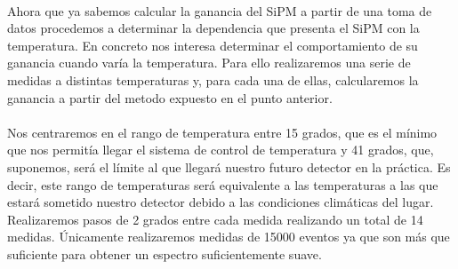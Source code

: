 \paragraph {}
Ahora que ya sabemos calcular la ganancia del SiPM a partir de una toma de datos procedemos a determinar la dependencia que presenta el SiPM con la temperatura. En concreto nos interesa determinar el comportamiento de su ganancia cuando varía la temperatura. Para ello realizaremos una serie de medidas a distintas temperaturas y, para cada una de ellas, calcularemos la ganancia a partir del metodo expuesto en el punto anterior.

\paragraph {}
Nos centraremos en el rango de temperatura entre 15 grados, que es el mínimo que nos permitía llegar el sistema de control de temperatura y 41 grados, que, suponemos, será el límite al que llegará nuestro futuro detector en la práctica. Es decir, este rango de temperaturas será equivalente a las temperaturas a las que estará sometido nuestro detector debido a las condiciones climáticas del lugar. Realizaremos pasos de 2 grados entre cada medida realizando un total de 14 medidas. Únicamente realizaremos medidas de 15000 eventos ya que son más que suficiente para obtener un espectro suficientemente suave. 

